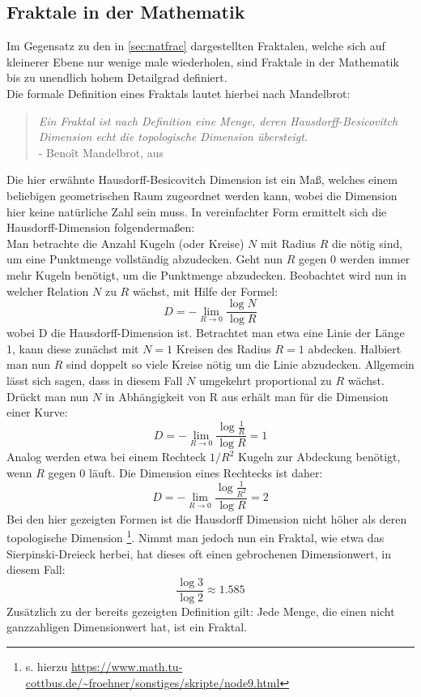 \documentclass[a4paper,12pt,onesided]{report}
\begin{document}
\subsection{Fraktale in der Mathematik}
Im Gegensatz zu den in \autoref{sec:natfrac} dargestellten Fraktalen, welche sich auf kleinerer Ebene nur wenige male wiederholen, sind Fraktale in der Mathematik bis zu unendlich hohem Detailgrad definiert.\\
Die formale Definition eines Fraktals lautet hierbei nach Mandelbrot:

\begin{quotation}
	\textit{Ein Fraktal ist nach Definition eine Menge, deren  Hausdorff-Besicovitch Dimension echt die topologische Dimension übersteigt.}
	\\ - Benoît Mandelbrot, aus \cite[S. 27]{mandelbrot2013fraktale}
\end{quotation}
Die hier erwähnte Hausdorff-Besicovitch Dimension ist ein Maß, welches einem beliebigen geometrischen Raum zugeordnet werden kann, wobei die Dimension hier keine natürliche Zahl sein muss. In vereinfachter Form ermittelt sich die Hausdorff-Dimension folgendermaßen:\\
Man betrachte die Anzahl Kugeln (oder Kreise) $N$ mit Radius $R$ die nötig sind, um eine Punktmenge vollständig abzudecken.
Geht nun $R$ gegen 0 werden immer mehr Kugeln benötigt, um die Punktmenge abzudecken. Beobachtet wird nun in welcher Relation $N$ zu $R$ wächst, mit Hilfe der Formel:
\[D = - \lim_{R \to 0} \frac{\log{N}}{\log{R}}\]
wobei D die Hausdorff-Dimension ist. Betrachtet man etwa eine Linie der Länge 1, kann diese zunächst mit $N = 1$ Kreisen des Radius $R = 1$ abdecken. Halbiert man nun $R$ sind doppelt so viele Kreise nötig um die Linie abzudecken. Allgemein lässt sich sagen, dass in diesem Fall $N$ umgekehrt proportional zu $R$ wächst. Drückt man nun $N$ in Abhängigkeit von R aus erhält man für die Dimension einer Kurve:
\[D = - \lim_{R \to 0} \frac{\log{\frac{1}{R}}}{\log{R}} = 1\]
Analog werden etwa bei einem Rechteck $1/R^2$ Kugeln zur Abdeckung benötigt, wenn $R$ gegen 0 läuft. Die Dimension eines Rechtecks ist daher:
\[D = - \lim_{R \to 0} \frac{\log{\frac{1}{R^2}}}{\log{R}} = 2\]
Bei den hier gezeigten Formen ist die Hausdorff Dimension nicht höher als deren topologische Dimension \footnote{s. hierzu \url{https://www.math.tu-cottbus.de/~froehner/sonstiges/skripte/node9.html}}.
Nimmt man jedoch nun ein Fraktal, wie etwa das Sierpinski-Dreieck herbei, hat dieses oft einen gebrochenen Dimensionwert, in diesem Fall:
\[\frac{\log{3}}{\log{2}}\approx 1.585\]
Zusätzlich zu der bereits gezeigten Definition gilt:
Jede Menge, die einen nicht ganzzahligen Dimensionwert hat, ist ein Fraktal\cite[S. 27]{mandelbrot2013fraktale}.
\end{document}

